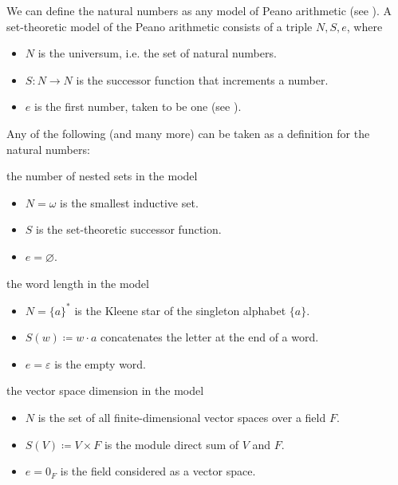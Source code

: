 \begin{definition}\label{def:peano_arithmetic_models}
  We can define the natural numbers as any model of Peano arithmetic (see ). A set-theoretic model of the Peano arithmetic consists of a triple \( N, S, e \), where
  \begin{itemize}
    \item \( N \) is the universum, i.e. the set of natural numbers.
    \item \( S: N \to N \) is the successor function that increments a number.
    \item \( e \) is the first number, taken to be one (see ).
  \end{itemize}

  Any of the following (and many more) can be taken as a definition for the natural numbers:
  \begin{defenum}
     the number of nested sets in the model
    \begin{itemize}
      \item \( N = \omega \) is the smallest inductive set.
      \item \( S \) is the set-theoretic successor function.
      \item \( e = \varnothing \).
    \end{itemize}

     the word length in the model
    \begin{itemize}
      \item \( N = \{ a \}^{*} \) is the Kleene star of the singleton alphabet \( \{ a \} \).
      \item \( S(w) \coloneqq w \cdot a \) concatenates the letter at the end of a word.
      \item \( e = \varepsilon \) is the empty word.
    \end{itemize}

     the vector space dimension in the model
    \begin{itemize}
      \item \( N \) is the set of all finite-dimensional vector spaces over a field \( F \).
      \item \( S(V) \coloneqq V \times F \) is the module direct sum of \( V \) and \( F \).
      \item \( e = 0_F \) is the field considered as a vector space.
    \end{itemize}
  \end{defenum}
\end{definition}

